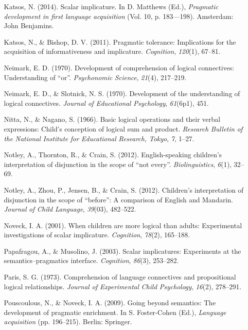 \documentclass[floatsintext,man]{apa6}
\theoremstyle{definition}
\theoremstyle{definition}
\theoremstyle{definition}
\theoremstyle{remark}
\begin{document}
\hypertarget{ref-katsos2014scalar}{}
Katsos, N. (2014). Scalar implicature. In D. Matthews (Ed.),
\emph{Pragmatic development in first language acquisition} (Vol. 10, p.
183---198). Amsterdam: John Benjamins.

\hypertarget{ref-katsos2011pragmatic}{}
Katsos, N., \& Bishop, D. V. (2011). Pragmatic tolerance: Implications
for the acquisition of informativeness and implicature.
\emph{Cognition}, \emph{120}(1), 67--81.

\hypertarget{ref-neimark1970}{}
Neimark, E. D. (1970). Development of comprehension of logical
connectives: Understanding of ``or''. \emph{Psychonomic Science},
\emph{21}(4), 217--219.

\hypertarget{ref-neimarkSlotnick1970}{}
Neimark, E. D., \& Slotnick, N. S. (1970). Development of the
understanding of logical connectives. \emph{Journal of Educational
Psychology}, \emph{61}(6p1), 451.

\hypertarget{ref-nitta1966basic}{}
Nitta, N., \& Nagano, S. (1966). Basic logical operations and their
verbal expressions: Child's conception of logical sum and product.
\emph{Research Bulletin of the National Institute for Educational
Research, Tokyo}, \emph{7}, 1--27.

\hypertarget{ref-notley2012notevery}{}
Notley, A., Thornton, R., \& Crain, S. (2012). English-speaking
children's interpretation of disjunction in the scope of ``not every''.
\emph{Biolinguistics}, \emph{6}(1), 32--69.

\hypertarget{ref-notley2012children}{}
Notley, A., Zhou, P., Jensen, B., \& Crain, S. (2012). Children's
interpretation of disjunction in the scope of ``before'': A comparison
of English and Mandarin. \emph{Journal of Child Language},
\emph{39}(03), 482--522.

\hypertarget{ref-noveck2001children}{}
Noveck, I. A. (2001). When children are more logical than adults:
Experimental investigations of scalar implicature. \emph{Cognition},
\emph{78}(2), 165--188.

\hypertarget{ref-papafragou2003scalar}{}
Papafragou, A., \& Musolino, J. (2003). Scalar implicatures: Experiments
at the semantics--pragmatics interface. \emph{Cognition}, \emph{86}(3),
253--282.

\hypertarget{ref-paris1973comprehension}{}
Paris, S. G. (1973). Comprehension of language connectives and
propositional logical relationships. \emph{Journal of Experimental Child
Psychology}, \emph{16}(2), 278--291.

\hypertarget{ref-pouscoulous2009going}{}
Pouscoulous, N., \& Noveck, I. A. (2009). Going beyond semantics: The
development of pragmatic enrichment. In S. Foster-Cohen (Ed.),
\emph{Language acquisition} (pp. 196--215). Berlin: Springer.
\end{document}
